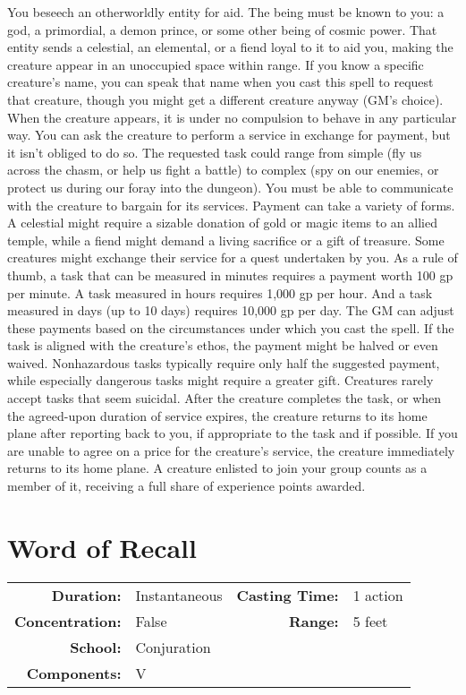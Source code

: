 \documentclass[a5paper, 12pt]{memoir}
\begin{document}
\vspace{1\baselineskip}\noindent You beseech an otherworldly entity for aid. The being must be known to you: a god, a primordial, a demon prince, or some other being of cosmic power. That entity sends a celestial, an elemental, or a fiend loyal to it to aid you, making the creature appear in an unoccupied space within range. If you know a specific creature's name, you can speak that name when you cast this spell to request that creature, though you might get a different creature anyway (GM's choice). When the creature appears, it is under no compulsion to behave in any particular way. You can ask the creature to perform a service in exchange for payment, but it isn't obliged to do so. The requested task could range from simple (fly us across the chasm, or help us fight a battle) to complex (spy on our enemies, or protect us during our foray into the dungeon). You must be able to communicate with the creature to bargain for its services. Payment can take a variety of forms. A celestial might require a sizable donation of gold or magic items to an allied temple, while a fiend might demand a living sacrifice or a gift of treasure. Some creatures might exchange their service for a quest undertaken by you. As a rule of thumb, a task that can be measured in minutes requires a payment worth 100 gp per minute. A task measured in hours requires 1,000 gp per hour. And a task measured in days (up to 10 days) requires 10,000 gp per day. The GM can adjust these payments based on the circumstances under which you cast the spell. If the task is aligned with the creature's ethos, the payment might be halved or even waived. Nonhazardous tasks typically require only half the suggested payment, while especially dangerous tasks might require a greater gift. Creatures rarely accept tasks that seem suicidal. After the creature completes the task, or when the agreed-upon duration of service expires, the creature returns to its home plane after reporting back to you, if appropriate to the task and if possible. If you are unable to agree on a price for the creature's service, the creature immediately returns to its home plane. A creature enlisted to join your group counts as a member of it, receiving a full share of experience points awarded.

\newpage
\section*{Word of Recall}

{
\small\centering\vspace{-6pt}
\begin{tabular}{rlrl}
\toprule

\textbf{Duration:} & Instantaneous &
\textbf{Casting Time:} & 1 action \\
\textbf{Concentration:} & False &
\textbf{Range:} & 5 feet \\
\textbf{School:} & Conjuration \\
\textbf{Components:} & \multicolumn{3}{p{0.7\textwidth}}{V}\\

\bottomrule
\end{tabular}
}
\end{document}
